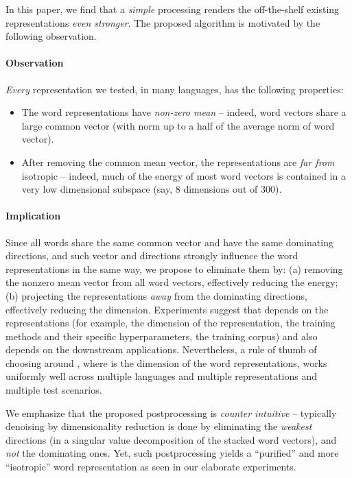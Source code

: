 \documentclass{article} \usepackage{acl2017,times}
\begin{document}
In this paper, we find that  a {\em simple} processing renders the off-the-shelf existing  representations {\em even stronger}. The proposed  algorithm is motivated by the following observation.

\paragraph{Observation}   {\em Every} representation we tested, in many languages,  has the following properties: 
\begin{itemize}\item The word representations have {\em non-zero mean} -- indeed, word vectors share a large  common vector (with norm up to a half of the average norm of word vector). 
\item After removing the common mean vector, the representations are {\em far from} isotropic -- indeed,  much of the energy of most word vectors is contained in a very low dimensional subspace (say, 8 dimensions out  of 300). 
\end{itemize} 


\paragraph{Implication} Since all words share the same common vector and have the same dominating directions, and such vector and directions strongly influence the word representations in the same way, we propose to eliminate them by: (a) removing the nonzero mean vector from all word vectors, effectively reducing the energy;  (b) projecting the representations {\em away} from the dominating  directions, effectively reducing the dimension. Experiments suggest that  depends on the representations (for example, the dimension of the representation, the training methods and their specific hyperparameters, the training corpus) and also depends on the downstream applications. Nevertheless, a rule of thumb of choosing  around , where  is the dimension of the word representations, works uniformly well across multiple languages and multiple representations and multiple test scenarios. 

We emphasize that the proposed postprocessing is {\em counter intuitive} -- typically  denoising by dimensionality reduction is done by eliminating the {\em weakest} directions (in a singular value decomposition of the stacked word vectors), and {\em not} the  dominating ones. Yet, such postprocessing yields a ``purified'' and  more ``isotropic'' word representation as seen in our elaborate experiments. 
\end{document}
